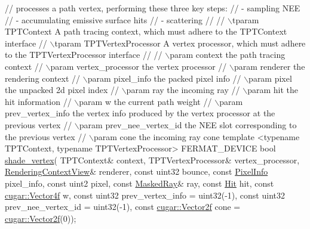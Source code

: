 \begin{DoxyParagraph}{}
\begin{DoxyCode}
\textcolor{comment}{// processes a path vertex, performing these three key steps:}
\textcolor{comment}{// - sampling NEE}
\textcolor{comment}{// - accumulating emissive surface hits}
\textcolor{comment}{// - scattering}
\textcolor{comment}{//}
\textcolor{comment}{// \(\backslash\)tparam TPTContext         A path tracing context, which must adhere to the TPTContext interface}
\textcolor{comment}{// \(\backslash\)tparam TPTVertexProcessor A vertex processor, which must adhere to the TPTVertexProcessor interface}
\textcolor{comment}{//}
\textcolor{comment}{// \(\backslash\)param context                  the path tracing context}
\textcolor{comment}{// \(\backslash\)param vertex\_processor         the vertex processor}
\textcolor{comment}{// \(\backslash\)param renderer                 the rendering context}
\textcolor{comment}{// \(\backslash\)param pixel\_info               the packed pixel info}
\textcolor{comment}{// \(\backslash\)param pixel                    the unpacked 2d pixel index}
\textcolor{comment}{// \(\backslash\)param ray                      the incoming ray}
\textcolor{comment}{// \(\backslash\)param hit                      the hit information}
\textcolor{comment}{// \(\backslash\)param w                        the current path weight}
\textcolor{comment}{// \(\backslash\)param prev\_vertex\_info         the vertex info produced by the vertex processor at the previous vertex}
\textcolor{comment}{// \(\backslash\)param prev\_nee\_vertex\_id       the NEE slot corresponding to the previous vertex}
\textcolor{comment}{// \(\backslash\)param cone                     the incoming ray cone}
\textcolor{keyword}{template} <\textcolor{keyword}{typename} TPTContext, \textcolor{keyword}{typename} TPTVertexProcessor>
FERMAT\_DEVICE
\textcolor{keywordtype}{bool} \hyperlink{group___p_t_lib_core_ga9b8be237ade285e6db792a9ea7bf900e}{shade\_vertex}(
  TPTContext&             context,
  TPTVertexProcessor&     vertex\_processor,
  \hyperlink{struct_rendering_context_view}{RenderingContextView}&   renderer,
  \textcolor{keyword}{const} uint32            bounce,
  \textcolor{keyword}{const} \hyperlink{union_pixel_info}{PixelInfo}         pixel\_info,
  \textcolor{keyword}{const} uint2             pixel,
  \textcolor{keyword}{const} \hyperlink{struct_masked_ray}{MaskedRay}&        ray,
  \textcolor{keyword}{const} \hyperlink{struct_hit}{Hit}               hit,
  \textcolor{keyword}{const} \hyperlink{structcugar_1_1_vector}{cugar::Vector4f}   w,
  \textcolor{keyword}{const} uint32            prev\_vertex\_info = uint32(-1),
  \textcolor{keyword}{const} uint32            prev\_nee\_vertex\_id    = uint32(-1),
  \textcolor{keyword}{const} \hyperlink{structcugar_1_1_vector}{cugar::Vector2f}   cone             = \hyperlink{structcugar_1_1_vector}{cugar::Vector2f}(0));
\end{DoxyCode}
 
\end{DoxyParagraph}
